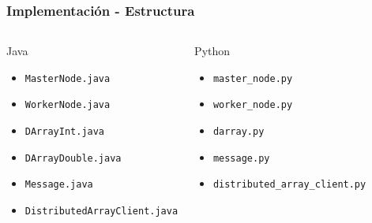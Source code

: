 \documentclass{beamer}
\begin{document}
\begin{frame}
\frametitle{Implementación - Estructura}
\begin{columns}
\begin{block}{Java}
    \begin{itemize}
        \item<1-> \texttt{MasterNode.java}
        \item<2-> \texttt{WorkerNode.java}
        \item<3-> \texttt{DArrayInt.java}
        \item<3-> \texttt{DArrayDouble.java}
        \item<4-> \texttt{Message.java}
        \item<5-> \texttt{DistributedArrayClient.java}
    \end{itemize}
\end{block}

\begin{block}{Python}
    \begin{itemize}
        \item<1-> \texttt{master\_node.py}
        \item<2-> \texttt{worker\_node.py}
        \item<3-> \texttt{darray.py}
        \item<4-> \texttt{message.py}
        \item<5-> \texttt{distributed\_array\_client.py}
    \end{itemize}
\end{block}
\end{columns}
\end{frame}
\end{document}

